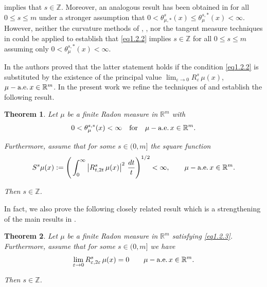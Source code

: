 \documentclass{elsart3-1}
\newcommand{\RR}{{\mathbb{R}}}
\newcommand{\ZZ}{{\mathbb{Z}}}
\newcommand{\eps}{\varepsilon}
\newtheorem{theorem}{Theorem}[section]
\begin{document}
\noindent implies that $s\in\ZZ$. Moreover, an analogous result has been obtained in \cite{Vi} for all $0\leq s\leq m$ under a stronger assumption that  $0<\theta^{s}_{\mu,\ast}(x)\leq \theta^{s,\ast}_{\mu}(x) <\infty$. However, neither the curvature methods of \cite{Pr1}, \cite{Pr2}, nor the tangent measure techniques in \cite{Vi} could be applied to establish that \eqref{eq1.2.2} implies $s\in\ZZ$ for all $0\leq s\leq m$ assuming only $0<\theta^{s,\ast}_{\mu}(x)<\infty$.

In  \cite{RdVTolsa} the authors proved that the latter statement holds if the condition \eqref{eq1.2.2} is substituted by the existence of  the principal value $\lim_{\eps\to 0} R_{\eps}^s\,\mu(x)$, $\mu - {\rm a.e.}\,x\in\RR^m$. In the present work we refine the techniques of  \cite{RdVTolsa} and establish the following result. 

\begin{theorem}\label{tSqF} Let $\mu$ be a finite Radon measure in $\RR^m$ with 
\begin{equation}\label{eq1.2.3}
0<\theta^{s,\ast}_{\mu}(x)<\infty\quad\mbox{for}\quad \mu - {\rm a.e.}\,x\in\RR^m.
\end{equation}

\noindent Furthermore, assume that  for some $s\in (0,m]$ the square function
\begin{equation}\label{eq1.3}
S^s\mu(x):=\Bigg(\int_0^\infty \left|R^s_{t,2t}\, \mu(x)\right|^2\,\frac{dt}{t}\Bigg)^{1/2}<\infty, \qquad \mu - {\rm a.e.}\,x\in\RR^m.
\end{equation}

\noindent Then $s\in\ZZ$.
\end{theorem}


In fact, we also prove the following closely related result which is a strengthening of  the main results in \cite{RdVTolsa}.\begin{theorem}\label{tLim} Let $\mu$ be a finite Radon measure in $\RR^m$  satisfying \eqref{eq1.2.3}. Furthermore, assume that  for some $s\in (0,m]$ we have
\begin{equation}\label{eq1.3.1}
\lim_{\eps\to 0}R^s_{\eps,2\eps}\,\mu(x)=0 \qquad \mu - {\rm a.e.}\,x\in\RR^m.
\end{equation}

\noindent Then $s\in\ZZ$.
\end{theorem}
\end{document}
